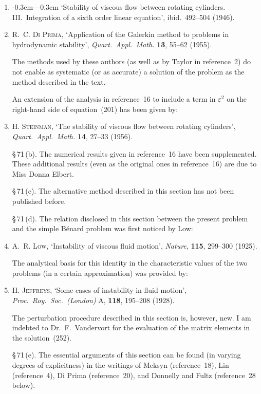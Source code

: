 \begin{enumerate}
\item \leavevmode\kern-0.3em---\kern0.3em `Stability of viscous flow between rotating cylinders.  III.~Integra\-tion
of a sixth order linear equation', ibid.\ 492--504 (1946).

\item R.~C. \textsc{Di Prima}, `Application of the Galerkin method to problems in
hydrodynamic stability', \textit{Quart.\ Appl.\ Math.} \textbf{13}, 55--62 (1955).

\noindent The methods used by these authors (as well as by Taylor in reference~2) do not
enable as systematic (or as accurate) a solution of the problem as the method
described in the text.

\noindent An extension of the analysis in reference~16 to include a term in $\varepsilon^2$ on the right-hand
side of equation~(201) has been given by:

\item H. \textsc{Steinman}, `The stability of viscous flow between rotating cylinders',
\textit{Quart.\ Appl.\ Math.} \textbf{14}, 27--33 (1956).

\medskip
\noindent\S\,71\,(b).  The numerical results given in reference~16 have been supplemented.
These additional results (even as the original ones in reference~16) are due to
Miss Donna Elbert.

\medskip
\noindent\S\,71\,(c).  The alternative method described in this section has not been published
before.

\medskip
\noindent\S\,71\,(d).  The relation disclosed in this section between the present problem and
the simple B\'enard problem was first noticed by Low:

\item A.~R. \textsc{Low}, `Instability of viscous fluid motion', \textit{Nature}, \textbf{115}, 299--300 (1925).

\noindent The analytical basis for this identity in the characteristic values of the two
problems (in a certain approximation) was provided by:

\item H. \textsc{Jeffreys}, `Some cases of instability in fluid motion', \textit{Proc.\ Roy.\ Soc.\
(London)} A, \textbf{118}, 195--208 (1928).

\noindent The perturbation procedure described in this section is, however, new.  I am
indebted to Dr.~F.~Vandervort for the evaluation of the matrix elements in the
solution~(252).

\medskip
\noindent\S\,71\,(e).  The essential arguments of this section can be found (in varying degrees
of explicitness) in the writings of Meksyn (reference~18), Lin (reference~4), Di
Prima (reference~20), and Donnelly and Fultz (reference~28 below).


\end{enumerate}
